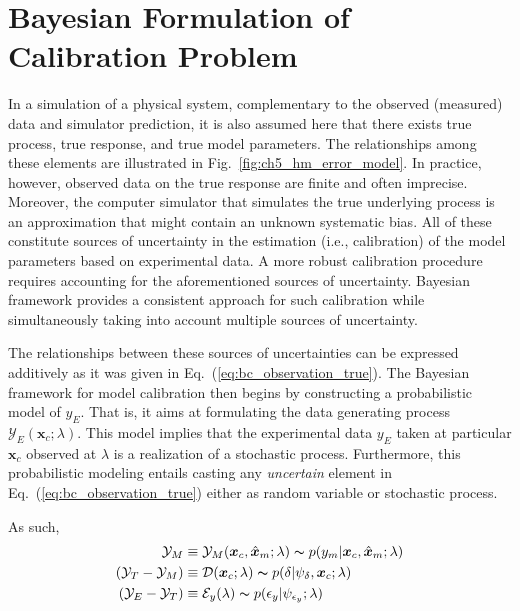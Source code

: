 \section{Bayesian Formulation of Calibration Problem}\label{sec:bc_modular}

In a simulation of a physical system, complementary to the observed (measured) data and simulator prediction, it is also assumed here that there exists true process, true response, and true model parameters. 
The relationships among these elements are illustrated in Fig.~\ref{fig:ch5_hm_error_model}.
In practice, however, observed data on the true response are finite and often imprecise.
Moreover, the computer simulator that simulates the true underlying process is an approximation that might contain an unknown systematic bias.
All of these constitute sources of uncertainty in the estimation (i.e., calibration) of the model parameters based on experimental data.
A more robust calibration procedure requires accounting for the aforementioned sources of uncertainty.
Bayesian framework provides a consistent approach for such calibration while simultaneously taking into account multiple sources of uncertainty.

The relationships between these sources of uncertainties can be expressed additively as it was given in Eq.~(\ref{eq:bc_observation_true}).
The Bayesian framework for model calibration then begins by constructing a probabilistic model of $y_E$. 
That is, it aims at formulating the data generating process $\mathcal{Y}_E(\bm{x}_c;\lambda)$.
This model implies that the experimental data $y_E$ taken at particular $\bm{x}_c$ observed at $\lambda$ is a realization of a stochastic process.
Furthermore, this probabilistic modeling entails casting any \emph{uncertain} element in Eq.~(\ref{eq:bc_observation_true}) either as random variable or stochastic process.

As such, 
\begin{equation}
    \begin{split}
        \mathcal{Y}_M & \equiv \mathcal{Y}_M (\bm{x}_c, \hat{\bm{x}}_m; \lambda) \thicksim  p(y_m | \bm{x}_c, \hat{\bm{x}}_m; \lambda) \\
        (\mathcal{Y}_T - \mathcal{Y}_M) & \equiv \mathcal{D}(\bm{x}_c; \lambda) \thicksim p(\delta | \psi_{\delta}, \bm{x}_c; \lambda) \\
        (\mathcal{Y}_E - \mathcal{Y}_T) & \equiv \mathcal{E}_y(\lambda) \thicksim p(\epsilon_y | \psi_{\epsilon_y}; \lambda) \\
    \end{split}
\label{eq:bc_additive_formulation}
\end{equation}

